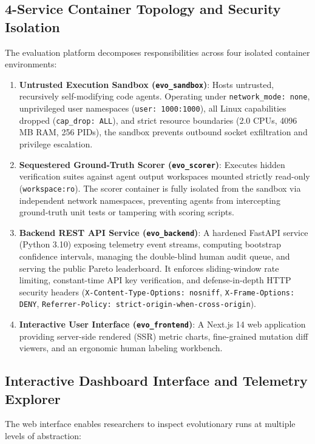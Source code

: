 \documentclass{article}
\begin{document}
\subsection{4-Service Container Topology and Security Isolation}
The evaluation platform decomposes responsibilities across four isolated container environments:
\begin{enumerate}
    \item \textbf{Untrusted Execution Sandbox (\texttt{evo\_sandbox})}: Hosts untrusted, recursively self-modifying code agents. Operating under \texttt{network\_mode: none}, unprivileged user namespaces (\texttt{user: 1000:1000}), all Linux capabilities dropped (\texttt{cap\_drop: ALL}), and strict resource boundaries (2.0 CPUs, 4096\,MB RAM, 256 PIDs), the sandbox prevents outbound socket exfiltration and privilege escalation.
    \item \textbf{Sequestered Ground-Truth Scorer (\texttt{evo\_scorer})}: Executes hidden verification suites against agent output workspaces mounted strictly read-only (\texttt{workspace:ro}). The scorer container is fully isolated from the sandbox via independent network namespaces, preventing agents from intercepting ground-truth unit tests or tampering with scoring scripts.
    \item \textbf{Backend REST API Service (\texttt{evo\_backend})}: A hardened FastAPI service (Python 3.10) exposing telemetry event streams, computing bootstrap confidence intervals, managing the double-blind human audit queue, and serving the public Pareto leaderboard. It enforces sliding-window rate limiting, constant-time API key verification, and defense-in-depth HTTP security headers (\texttt{X-Content-Type-Options: nosniff}, \texttt{X-Frame-Options: DENY}, \texttt{Referrer-Policy: strict-origin-when-cross-origin}).
    \item \textbf{Interactive User Interface (\texttt{evo\_frontend})}: A Next.js 14 web application providing server-side rendered (SSR) metric charts, fine-grained mutation diff viewers, and an ergonomic human labeling workbench.
\end{enumerate}

\subsection{Interactive Dashboard Interface and Telemetry Explorer}
The web interface enables researchers to inspect evolutionary runs at multiple levels of abstraction:
\end{document}
